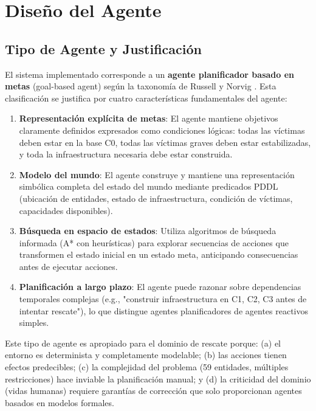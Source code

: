 \documentclass[conference]{IEEEtran}
\begin{document}
    \section{Diseño del Agente}

    \subsection{Tipo de Agente y Justificación}

    El sistema implementado corresponde a un \textbf{agente planificador basado en metas} (goal-based agent) según la taxonomía de Russell y Norvig \cite{russell2020aima}. Esta clasificación se justifica por cuatro características fundamentales del agente:

    \begin{enumerate}[leftmargin=*,itemsep=2pt]
    \item \textbf{Representación explícita de metas}: El agente mantiene objetivos claramente definidos expresados como condiciones lógicas: todas las víctimas deben estar en la base C0, todas las víctimas graves deben estar estabilizadas, y toda la infraestructura necesaria debe estar construida.

    \item \textbf{Modelo del mundo}: El agente construye y mantiene una representación simbólica completa del estado del mundo mediante predicados PDDL (ubicación de entidades, estado de infraestructura, condición de víctimas, capacidades disponibles).

    \item \textbf{Búsqueda en espacio de estados}: Utiliza algoritmos de búsqueda informada (A* con heurísticas) para explorar secuencias de acciones que transformen el estado inicial en un estado meta, anticipando consecuencias antes de ejecutar acciones.

    \item \textbf{Planificación a largo plazo}: El agente puede razonar sobre dependencias temporales complejas (e.g., "construir infraestructura en C1, C2, C3 antes de intentar rescate"), lo que distingue agentes planificadores de agentes reactivos simples.
    \end{enumerate}

    Este tipo de agente es apropiado para el dominio de rescate porque: (a) el entorno es determinista y completamente modelable; (b) las acciones tienen efectos predecibles; (c) la complejidad del problema (59 entidades, múltiples restricciones) hace inviable la planificación manual; y (d) la criticidad del dominio (vidas humanas) requiere garantías de corrección que solo proporcionan agentes basados en modelos formales.
\end{document}
